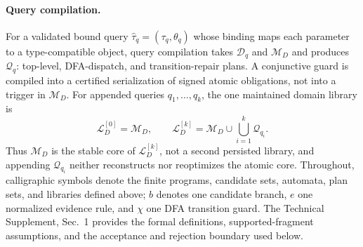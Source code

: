 \paragraph{Query compilation.}
For a validated bound query
$\widehat\tau_q=(\tau_q,\theta_q)$ whose binding maps each parameter to a
type-compatible object, query compilation takes $\mathcal D_q$ and $\mathcal M_D$
and produces $\mathcal Q_q$: top-level, DFA-dispatch, and transition-repair
plans. A conjunctive guard is compiled into a certified serialization of signed
atomic obligations, not into a trigger in $\mathcal M_D$. For appended queries
$q_1,\ldots,q_k$, the one maintained domain library is
\[
\mathcal{L}_D^{[0]}=\mathcal{M}_D,
\qquad
\mathcal{L}_D^{[k]}=
\mathcal{M}_D\cup\bigcup_{i=1}^{k}\mathcal{Q}_{q_i}.
\]
Thus $\mathcal M_D$ is the stable core of $\mathcal L_D^{[k]}$, not a
second persisted library, and appending $\mathcal Q_{q_i}$ neither reconstructs
nor reoptimizes the atomic core. Throughout, calligraphic symbols denote the
finite programs, candidate sets, automata, plan sets, and libraries defined
above; $b$ denotes one candidate branch, $e$ one
normalized evidence rule, and $\chi$ one DFA transition guard. The Technical
Supplement, Sec.~1 provides the formal definitions, supported-fragment
assumptions, and the acceptance and rejection boundary used below.
